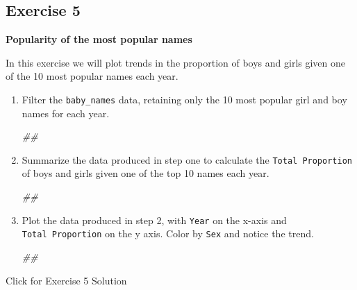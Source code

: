 \documentclass[
]{book}
\newenvironment{Shaded}{\begin{snugshade}}{\end{snugshade}}
\newcommand{\CommentTok}[1]{\textcolor[rgb]{0.56,0.35,0.01}{\textit{#1}}}
\begin{document}
\hypertarget{exercise-5}{%
\subsection{Exercise 5}\label{exercise-5}}

\textbf{Popularity of the most popular names}

In this exercise we will plot trends in the proportion of boys and girls given one of the 10 most popular names each year.

\begin{enumerate}
\def\labelenumi{\arabic{enumi}.}
\item
  Filter the \texttt{baby\_names} data, retaining only the 10 most popular girl and boy names for each year.

\begin{Shaded}
\begin{Highlighting}[]
\CommentTok{\#\#}
\end{Highlighting}
\end{Shaded}
\item
  Summarize the data produced in step one to calculate the \texttt{Total\ Proportion} of boys and girls given one of the top 10 names each year.

\begin{Shaded}
\begin{Highlighting}[]
\CommentTok{\#\#}
\end{Highlighting}
\end{Shaded}
\item
  Plot the data produced in step 2, with \texttt{Year} on the x-axis and \texttt{Total\ Proportion} on the y axis. Color by \texttt{Sex} and notice the trend.

\begin{Shaded}
\begin{Highlighting}[]
\CommentTok{\#\#}
\end{Highlighting}
\end{Shaded}
\end{enumerate}

{Click for Exercise 5 Solution}
\end{document}

